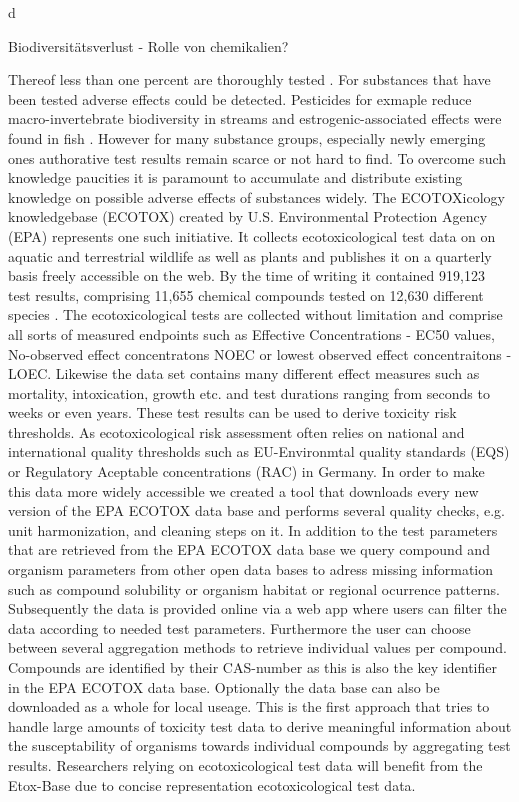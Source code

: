 d\documentclass[english]{article}
\newcommand{\etoxbase}{Etox-Base}
\newcommand{\epa}{EPA ECOTOX data base}
\begin{document}
Biodiversitätsverlust - Rolle von chemikalien?


Thereof less than one percent are thoroughly tested \citep{breithaupt_costs_2006}. For substances that have been tested adverse effects could be detected. Pesticides for exmaple reduce macro-invertebrate biodiversity in streams \citep{beketov_pesticides_2013} and estrogenic-associated effects were found in fish \citep{vethaak_integrated_2005}. However for many substance groups, especially newly emerging ones authorative test results remain scarce or not hard to find. To overcome such knowledge paucities it is paramount to accumulate and distribute existing knowledge on possible adverse effects of substances widely. The ECOTOXicology knowledgebase (ECOTOX) created by U.S. Environmental Protection Agency (EPA) represents one such initiative. It collects ecotoxicological test data on on aquatic and terrestrial wildlife as well as plants and publishes it on a quarterly basis freely accessible on the web. By the time of writing it contained 919,123 test results, comprising 11,655 chemical compounds tested on 12,630 different species \citep{elonen_ecotoxicology_2018}. The ecotoxicological tests are collected without limitation and comprise all sorts of measured endpoints such as Effective Concentrations - EC50 values, No-observed effect concentratons NOEC or lowest observed effect concentraitons - LOEC. Likewise the data set contains many different effect measures such as mortality, intoxication, growth etc. and test durations ranging from seconds to weeks or even years. These test results can be used to derive toxicity risk thresholds. As ecotoxicological risk assessment often relies on national and international quality thresholds such as EU-Environmtal quality standards (EQS) or Regulatory Aceptable concentrations (RAC) in Germany. In order to make this data more widely accessible we created a tool that downloads every new version of the \epa{} and performs several quality checks, e.g. unit harmonization, and cleaning steps on it. In addition to the test parameters that are retrieved from the \epa{} we query compound and organism parameters from other open data bases to adress missing information such as compound solubility or organism habitat or regional ocurrence patterns. Subsequently the data is provided online via a web app where users can filter the data according to needed test parameters. Furthermore the user can choose between several aggregation methods to retrieve individual values per compound. Compounds are identified by their CAS-number as this is also the key identifier in the \epa{}. Optionally the data base can also be downloaded as a whole for local useage. This is the first approach that tries to handle large amounts of toxicity test data to derive meaningful information about the susceptability of organisms towards individual compounds by aggregating test results. Researchers relying on ecotoxicological test data will benefit from the \etoxbase{} due to concise representation ecotoxicological test data.
\end{document}
